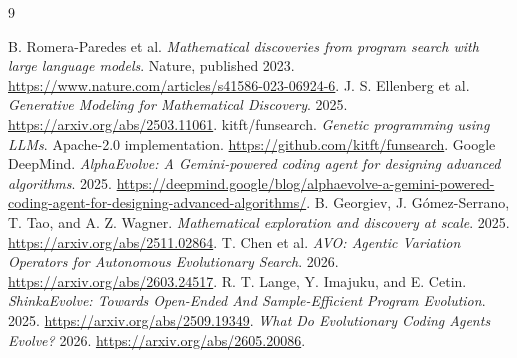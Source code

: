 \documentclass[11pt]{article}
\begin{document}
\begin{thebibliography}{9}
\raggedright
{} B. Romera-Paredes et al.
\emph{Mathematical discoveries from program search with large language models}.
Nature, published 2023.
\url{https://www.nature.com/articles/s41586-023-06924-6}.
 J. S. Ellenberg et al.
\emph{Generative Modeling for Mathematical Discovery}. 2025.
\url{https://arxiv.org/abs/2503.11061}.
 kitft/funsearch. \emph{Genetic programming using LLMs}.
Apache-2.0 implementation. \url{https://github.com/kitft/funsearch}.
 Google DeepMind.
\emph{AlphaEvolve: A Gemini-powered coding agent for designing advanced algorithms}.
2025. \url{https://deepmind.google/blog/alphaevolve-a-gemini-powered-coding-agent-for-designing-advanced-algorithms/}.
 B. Georgiev, J. G\'omez-Serrano, T. Tao, and A. Z. Wagner.
\emph{Mathematical exploration and discovery at scale}. 2025.
\url{https://arxiv.org/abs/2511.02864}.
 T. Chen et al.
\emph{AVO: Agentic Variation Operators for Autonomous Evolutionary Search}. 2026.
\url{https://arxiv.org/abs/2603.24517}.
 R. T. Lange, Y. Imajuku, and E. Cetin.
\emph{ShinkaEvolve: Towards Open-Ended And Sample-Efficient Program Evolution}.
2025. \url{https://arxiv.org/abs/2509.19349}.
 \emph{What Do Evolutionary Coding Agents Evolve?} 2026.
\url{https://arxiv.org/abs/2605.20086}.
\end{thebibliography}
\end{document}
